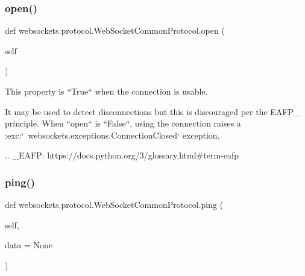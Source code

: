 \subsubsection{\texorpdfstring{open()}{open()}}
{\footnotesize\ttfamily def websockets.\+protocol.\+Web\+Socket\+Common\+Protocol.\+open (\begin{DoxyParamCaption}\item[{}]{self }\end{DoxyParamCaption})}

\begin{DoxyVerb}This property is ``True`` when the connection is usable.

It may be used to detect disconnections but this is discouraged per
the EAFP_ principle. When ``open`` is ``False``, using the connection
raises a :exc:`~websockets.exceptions.ConnectionClosed` exception.

.. _EAFP: https://docs.python.org/3/glossary.html#term-eafp\end{DoxyVerb}
 \mbox{\label{classwebsockets_1_1protocol_1_1_web_socket_common_protocol_a660f3e46bbe578a1c624c544bf3e9e87}} 
\subsubsection{\texorpdfstring{ping()}{ping()}}
{\footnotesize\ttfamily def websockets.\+protocol.\+Web\+Socket\+Common\+Protocol.\+ping (\begin{DoxyParamCaption}\item[{}]{self,  }\item[{}]{data = {\ttfamily None} }\end{DoxyParamCaption})}

